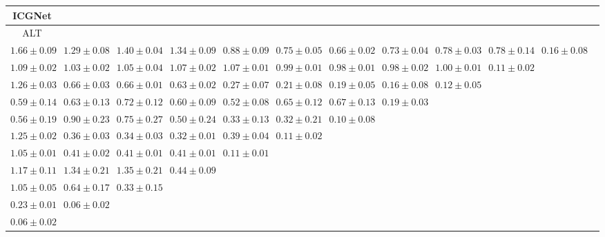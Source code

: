 \begin{table}[ht]
{{\begin{adjustbox}{width=\textwidth}
\begin{tabular}{cccccccccccc}
\hline
ICGNet &  &  &  &  &  &  &  &  &  & \\
\hline
ALT &  &  &  &  &  &  &  &  &  & \\
\hline
$1.66 \pm 0.09$ & $1.29 \pm 0.08$ & $1.40 \pm 0.04$ & $1.34 \pm 0.09$ & $0.88 \pm 0.09$ & $0.75 \pm 0.05$ & $0.66 \pm 0.02$ & $0.73 \pm 0.04$ & $0.78 \pm 0.03$ & $0.78 \pm 0.14$ & $0.16 \pm 0.08$ &  \\
$1.09 \pm 0.02$ & $1.03 \pm 0.02$ & $1.05 \pm 0.04$ & $1.07 \pm 0.02$ & $1.07 \pm 0.01$ & $0.99 \pm 0.01$ & $0.98 \pm 0.01$ & $0.98 \pm 0.02$ & $1.00 \pm 0.01$ & $0.11 \pm 0.02$ &  &  \\
$1.26 \pm 0.03$ & $0.66 \pm 0.03$ & $0.66 \pm 0.01$ & $0.63 \pm 0.02$ & $0.27 \pm 0.07$ & $0.21 \pm 0.08$ & $0.19 \pm 0.05$ & $0.16 \pm 0.08$ & $0.12 \pm 0.05$ &  &  &  \\
$0.59 \pm 0.14$ & $0.63 \pm 0.13$ & $0.72 \pm 0.12$ & $0.60 \pm 0.09$ & $0.52 \pm 0.08$ & $0.65 \pm 0.12$ & $0.67 \pm 0.13$ & $0.19 \pm 0.03$ &  &  &  &  \\
$0.56 \pm 0.19$ & $0.90 \pm 0.23$ & $0.75 \pm 0.27$ & $0.50 \pm 0.24$ & $0.33 \pm 0.13$ & $0.32 \pm 0.21$ & $0.10 \pm 0.08$ &  &  &  &  &  \\
$1.25 \pm 0.02$ & $0.36 \pm 0.03$ & $0.34 \pm 0.03$ & $0.32 \pm 0.01$ & $0.39 \pm 0.04$ & $0.11 \pm 0.02$ &  &  &  &  &  &  \\
$1.05 \pm 0.01$ & $0.41 \pm 0.02$ & $0.41 \pm 0.01$ & $0.41 \pm 0.01$ & $0.11 \pm 0.01$ &  &  &  &  &  &  &  \\
$1.17 \pm 0.11$ & $1.34 \pm 0.21$ & $1.35 \pm 0.21$ & $0.44 \pm 0.09$ &  &  &  &  &  &  &  &  \\
$1.05 \pm 0.05$ & $0.64 \pm 0.17$ & $0.33 \pm 0.15$ &  &  &  &  &  &  &  &  &  \\
$0.23 \pm 0.01$ & $0.06 \pm 0.02$ &  &  &  &  &  &  &  &  &  &  \\
$0.06 \pm 0.02$ &  &  &  &  &  &  &  &  &  &  &  \\


\end{tabular}
\end{adjustbox}}}
\end{table}
